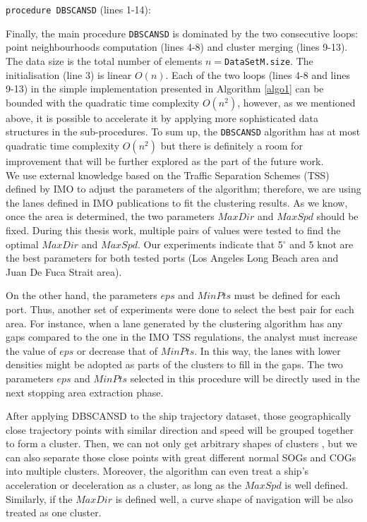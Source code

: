 \documentclass[12pt,glossary]{dalcsthesis}
\begin{document}
\noindent\texttt{procedure DBSCANSD} (lines 1-14):

\noindent Finally, the main procedure \texttt{DBSCANSD} is dominated by the two consecutive loops: point neighbourhoods computation (lines 4-8) and cluster merging (lines 9-13). The data size is the total number of elements $n=$\texttt{DataSetM.size}. The initialisation (line 3) is linear $O(n)$. Each of the two loops (lines 4-8 and lines 9-13) in the simple implementation presented in Algorithm \ref{algo1} can be bounded with the quadratic time complexity $O(n^2)$, however, as we mentioned above, it is possible to accelerate it by applying more sophisticated data structures in the sub-procedures. To sum up, the \texttt{DBSCANSD} algorithm has at most quadratic time complexity $O(n^2)$ but there is definitely a room for improvement that will be further explored as the part of the future work. \\



We use external knowledge based on the Traffic Separation Schemes (TSS) \cite{tss} defined by IMO to adjust the parameters of the algorithm; therefore, we are using the lanes defined in IMO publications to fit the clustering results. As we know, once the area is determined, the two parameters $MaxDir$ and $MaxSpd$ should be fixed. During this thesis work, multiple pairs of values were tested to find the optimal $MaxDir$ and $MaxSpd$. Our experiments indicate that 5$^{\circ}$ and 5 knot are the best parameters for both tested ports (Los Angeles Long Beach area and Juan De Fuca Strait area). 

On the other hand, the parameters $eps$ and $MinPts$ must be defined for each port. Thus, another set of experiments were done to select the best pair for each area. For instance, when a lane generated by the clustering algorithm has any gaps compared to the one in the IMO TSS regulations, the analyst must increase the value of $eps$ or decrease that of $MinPts$. In this way, the lanes with lower densities might be adopted as parts of the clusters to fill in the gaps. The two parameters $eps$ and $MinPts$ selected in this procedure will be directly used in the next stopping area extraction phase.

After applying DBSCANSD to the ship trajectory dataset, those geographically close trajectory points with similar direction and speed will be grouped together to form a cluster. Then, we can not only get arbitrary shapes of clusters , but we can also separate those close points with great different normal SOGs and COGs into multiple clusters. Moreover, the algorithm can even treat a ship's acceleration or deceleration as a cluster, as long as the $MaxSpd$ is well defined. Similarly, if the $MaxDir$ is defined well, a curve shape of navigation will be also treated as one cluster.
\end{document}
